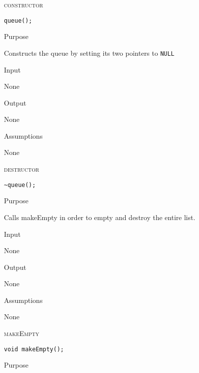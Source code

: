 \documentclass[pdftex, 11pt]{article}
\begin{document}
\begin{description}

	\item{\textsc{constructor}}

		\begin{lstlisting}
queue();
		\end{lstlisting}

		\begin{description}
			\item{Purpose}
				
				Constructs the queue by setting its two pointers
				to \texttt{NULL}

			\item{Input}

				None

			\item{Output}
				
				None

			\item{Assumptions}

				None

		\end{description}


	\item{\textsc{destructor}}

		\begin{lstlisting}
~queue();
		\end{lstlisting}

		\begin{description}
			\item{Purpose}
				
				Calls makeEmpty in order to empty and destroy
				the entire list.

			\item{Input}

				None

			\item{Output}
				
				None

			\item{Assumptions}

				None

		\end{description}
	\item{\textsc{makeEmpty}}

		\begin{lstlisting}
void makeEmpty();
		\end{lstlisting}

		\begin{description}
			\item{Purpose}
				

\end{description}
\end{description}
\end{document}
